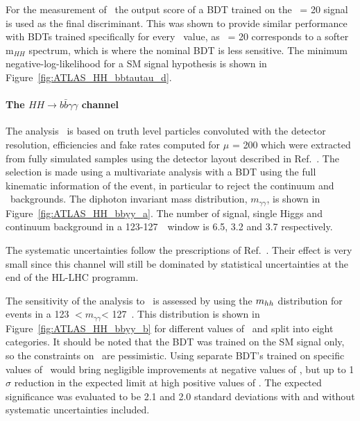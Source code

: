 For the measurement of \kl\ the output score of a BDT trained on the \kl\ = 20 signal is used as the final discriminant. This was shown to provide similar performance with BDTs trained specifically for every \kl\ value, as \kl\ = 20 corresponds to a softer m$_{HH}$ spectrum, which is where the nominal BDT is less sensitive.
The minimum negative-log-likelihood for a SM signal hypothesis is shown in Figure~\ref{fig:ATLAS_HH_bbtautau_d}.




%
\paragraph{The $HH \rightarrow b\bar{b}\gamma\gamma$ channel}


The analysis~\cite{ATLASHHPUBnote} is based on truth level particles convoluted with the detector resolution, efficiencies and fake rates computed for $\mu$ = 200 which were extracted from fully simulated samples using the detector layout described in Ref.~\cite{ITKPixelTDR}. The selection is made using a multivariate analysis with a BDT using the full kinematic information of the event, in particular to reject the continuum and \ttH\ backgrounds. 
The diphoton invariant mass distribution, $\ensuremath{m_{\gamma\gamma}}$, is shown in Figure~\ref{fig:ATLAS_HH_bbyy_a}. The number of signal, single Higgs and continuum background in a 123-127~\GeV\ window is 6.5, 3.2 and 3.7 respectively.

The systematic uncertainties follow the prescriptions of Ref.~\cite{ATLASperfPUBnote}. Their effect is very small since this channel will still be dominated by statistical uncertainties at the end of the HL-LHC programm.


The sensitivity of the analysis to \kl\ is assessed by using the $m_{hh}$ distribution for events in a 123 $ < \ensuremath{m_{\gamma\gamma}} $< 127~\GeV. This distribution is shown in Figure~\ref{fig:ATLAS_HH_bbyy_b} for different values of \kl\ and split into eight categories. It should be noted that the BDT was trained on the SM signal only, so the constraints on \kl\ are pessimistic. Using separate BDT's trained on specific values of \kl\ would bring negligible improvements at negative values of \kl, but up to 1$\sigma$ reduction in the expected limit at high positive values of \kl.
The expected significance was evaluated to be 2.1 and 2.0 standard deviations with and without systematic uncertainties included.

